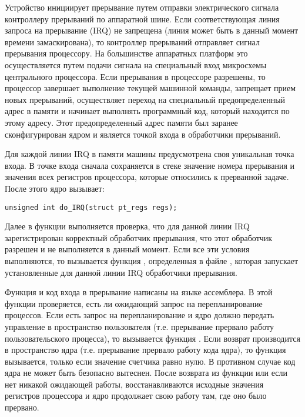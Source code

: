 Устройство инициирует прерывание путем отправки электрического сигнала контроллеру прерываний по аппаратной шине. Если соответствующая линия запроса на прерывание (IRQ) не запрещена (линия может быть в данный момент времени замаскирована), то контроллер прерываний отправляет сигнал прерывания процессору. На большинстве аппаратных платформ это осуществляется путем подачи сигнала на специальный
вход микросхемы центрального процессора. Если прерывания в процессоре разрешены, то процессор завершает выполнение текущей машинной команды, запрещает прием новых прерываний, осуществляет переход на специальный предопределенный адрес в памяти и начинает выполнять программный
код, который находится по этому адресу. Этот предопределенный адрес памяти был заранее сконфигурирован ядром и является точкой входа в обработчики прерываний.

Для каждой линии IRQ в памяти машины предусмотрена своя уникальная точка входа. В точке входа сначала сохраняется в стеке значение номера прерывания и значения всех регистров процессора, которые относились к прерванной задаче. После этого ядро вызывает:

\begin{lstlisting}
unsigned int do_IRQ(struct pt_regs regs);
\end{lstlisting}

Далее в функции  выполняется проверка, что для данной линии IRQ зарегистрирован корректный обработчик прерывания, что этот обработчик разрешен и не
выполняется в данный момент. Если все эти условия выполняются, то вызывается функция , определенная в файле , которая запускает установленные для данной линии IRQ обработчики прерывания.

Функция  и код входа в прерывание написаны на языке ассемблера. В этой функции проверяется, есть ли ожидающий запрос на перепланирование процессов. Если есть запрос на перепланирование и ядро должно передать управление в пространство пользователя (т.е. прерывание прервало работу пользовательского процесса), то вызывается функция . 
Если возврат производится в пространство ядра (т.е. прерывание прервало работу кода ядра), то функция  вызывается, только если значение счетчика  равно нулю. В противном случае код ядра не может быть безопасно вытеснен. После возврата из функции  или если нет никакой ожидающей работы, восстанавливаются исходные значения регистров процессора и ядро продолжает свою работу там, где оно было прервано.

